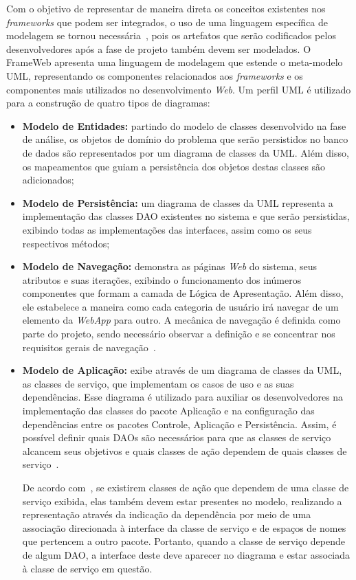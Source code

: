 Com o objetivo de representar de maneira direta os conceitos existentes nos \textit{frameworks} que podem ser integrados, o uso de uma linguagem específica de modelagem se tornou necessária~\cite{martins-souza:webmedia15}, pois os artefatos que serão codificados pelos desenvolvedores após a fase de projeto também devem ser modelados. O FrameWeb apresenta uma linguagem de modelagem que estende o meta-modelo UML, representando os componentes relacionados aos \textit{frameworks} e os componentes mais utilizados no desenvolvimento \textit{Web}. Um perfil UML é utilizado para a construção de quatro tipos de diagramas: 

\begin{itemize}  

	\item \textbf{Modelo de Entidades:} partindo do modelo de classes desenvolvido na fase de análise, os objetos de domínio do problema que serão persistidos no banco de dados são representados por um diagrama de classes da UML. Além disso, os mapeamentos que guiam a persistência dos objetos destas classes são adicionados;
	
	\item \textbf{Modelo de Persistência:} um diagrama de classes da UML representa a implementação das classes DAO existentes no sistema e que serão persistidas, exibindo todas as implementações das interfaces, assim como os seus respectivos métodos;
	
	\item \textbf{Modelo de Navegação:} demonstra as páginas \textit{Web} do sistema, seus atributos e suas iterações, exibindo o funcionamento dos inúmeros componentes que formam a camada de Lógica de Apresentação. Além disso, ele estabelece a maneira como cada categoria de usuário irá navegar de um elemento da \textit{WebApp} para outro. A mecânica de navegação é definida como parte do projeto, sendo necessário observar a definição e se concentrar nos requisitos gerais de navegação~\cite{pressman:es11}.	
	
	\item \textbf{Modelo de Aplicação:} exibe através de um diagrama de classes da UML, as classes de serviço, que implementam os casos de uso e as suas dependências. Esse diagrama é utilizado para auxiliar os desenvolvedores na implementação das classes do pacote Aplicação e na configuração das dependências entre os pacotes Controle, Aplicação e Persistência. Assim, é possível definir quais DAOs são necessários para que as classes de serviço alcancem seus objetivos e quais classes de ação dependem de quais classes de serviço~\cite{souza:masterthesis07}.

De acordo com~, se existirem classes de ação que dependem de uma classe de serviço exibida, elas também devem estar presentes no modelo, realizando a representação através da indicação da dependência por meio de uma associação direcionada à interface da classe de serviço e de espaços de nomes que pertencem a outro pacote. Portanto, quando a classe de serviço depende de algum DAO, a interface deste deve aparecer no diagrama e estar associada à classe de serviço em questão.	

\end{itemize}

